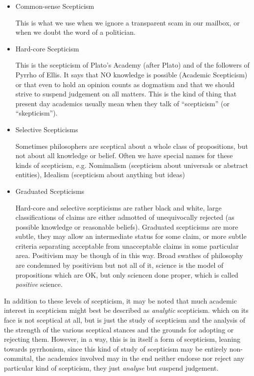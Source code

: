 \documentclass[14pt,titlepage]{extarticle}
\begin{document}
\begin{itemize}
\item Common-sense Scepticism

  This is what we use when we ignore a transparent scam in our mailbox, or when we doubt the word of a politician.

\item Hard-core Scepticism

  This is the scepticism of Plato's Academy (after Plato) and of the followers of Pyrrho of Ellis.
  It says that NO knowledge is possible (Academic Scepticism) or that even to hold an opinion counts as dogmatism and that we should strive to suspend judgement on all matters.
  This is the kind of thing that present day academics usually mean when they talk of ``scepticism'' (or ``skepticism'').

\item Selective Scepticisms

  Sometimes philosophers are sceptical about a whole class of propositions, but not about all knowledge or belief.
  Often we have special names for these kinds of scepticism, e.g. Nomimalism (scepticism about universals or abstract entities), Idealism (scepticism about anything but ideas)

\item Graduated Scepticisms

  Hard-core and selective scepticisms are rather black and white, large classifications of claims are either admotted of unequivocally rejected (as possible knowledge or reasonable beliefs).
  Graduated scepticisms are more subtle, they may allow an intermediate status for some claim, or more subtle criteria separating acceptable from unacceptable claims in some particular area.
  Positivism may be though of in this way.
  Broad swathes of philosophy are condemned by positivism but not all of it, science is the model of propositions which are OK, but only sciencen done proper, which is called {\it positive} science.
\end{itemize}

In addition to these levels of scepticism, it may be noted that much academic interest in scepticism might best be described as {\it analytic} scepticism. which on its face is not sceptical at all, but is just the study of scepticism and the analysis of the strength of the various sceptical stances and the grounds for adopting or rejecting them.
However, in a way, this is in itself a form of scepticism, leaning towards pyrrhonism, since this kind of study of scepticism may be entirely non-commital, the academics involved may in the end neither endorse nor reject any particular kind of scepticism, they just {\it analyse} but suspend judgement.
\end{document}
